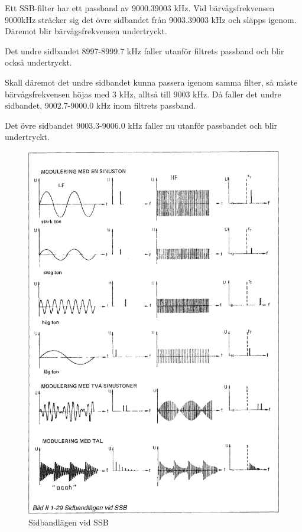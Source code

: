 Ett SSB-filter har ett passband av 9000.39003 kHz. Vid bärvågsfrekvensen 9000kHz
sträcker sig det övre sidbandet från 9003.39003 kHz och släpps igenom. Däremot
blir bärvågsfrekvensen undertryckt.

Det undre sidbandet 8997-8999.7 kHz faller utanför filtrets passband och blir
också undertryckt.

Skall däremot det undre sidbandet kunna passera igenom samma filter, så måste
bärvågsfrekvensen höjas med 3 kHz, alltså till 9003 kHz. Då faller det undre
sidbandet, 9002.7-9000.0 kHz inom filtrets passband.

Det övre sidbandet 9003.3-9006.0 kHz faller nu utanför passbandet och blir
undertryckt.

\begin{figure}[ht]
\begin{center}
\includegraphics[width=14cm]{images/bild_2_1-29}
\caption{Sidbandlägen vid SSB}
\label{fig:BildII1-29}
\end{center}
\end{figure}

